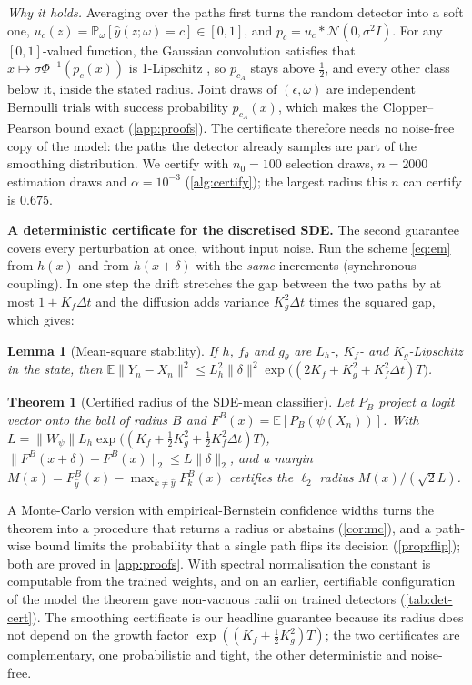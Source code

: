 \documentclass{article}
\newtheorem{theorem}{Theorem}
\newtheorem{lemma}{Lemma}
\theoremstyle{definition}
\newcommand{\Exp}{\mathbb{E}}
\newcommand{\Prob}{\mathbb{P}}
\begin{document}
\emph{Why it holds.} Averaging over the paths first turns the random detector
into a soft one, $u_c(z)=\Prob_\omega[\hat y(z;\omega)=c]\in[0,1]$, and
$p_c=u_c*\mathcal N(0,\sigma^2I)$. For any $[0,1]$-valued function, the
Gaussian convolution satisfies that $x\mapsto\sigma\Phi^{-1}(p_c(x))$ is
1-Lipschitz \citep[Lemma~2]{salman2019smoothadv}, so $p_{c_A}$ stays above
$\tfrac12$, and every other class below it, inside the stated radius. Joint
draws of $(\epsilon,\omega)$ are independent Bernoulli trials with success
probability $p_{c_A}(x)$, which makes the Clopper--Pearson bound exact
(\cref{app:proofs}). The certificate therefore needs no noise-free copy of the
model: the paths the detector already samples are part of the smoothing
distribution. We certify with $n_0=100$ selection draws, $n=2000$ estimation
draws and $\alpha=10^{-3}$ (\cref{alg:certify}); the largest radius this $n$ can
certify is $0.675$.




\textbf{A deterministic certificate for the discretised SDE.} The second
guarantee covers every perturbation at once, without input noise. Run the scheme
\eqref{eq:em} from $h(x)$ and from $h(x+\delta)$ with the \emph{same} increments
(synchronous coupling). In one step the drift stretches the gap between the two
paths by at most $1+K_f\Delta t$ and the diffusion adds variance $K_g^2\Delta t$
times the squared gap, which gives:

\begin{lemma}[Mean-square stability]\label{lem:ms}
If $h$, $f_\theta$ and $g_\theta$ are $L_h$-, $K_f$- and $K_g$-Lipschitz in the
state, then $\Exp\|Y_n-X_n\|^2\le L_h^2\|\delta\|^2\exp\bigl((2K_f+K_g^2+K_f^2\Delta t)T\bigr)$.
\end{lemma}

\begin{theorem}[Certified radius of the SDE-mean classifier]\label{thm:mean-cert}
Let $P_B$ project a logit vector onto the ball of radius $B$ and
$F^B(x)=\Exp[P_B(\psi(X_n))]$. With
$L=\|W_\psi\|L_h\exp\bigl((K_f+\tfrac12K_g^2+\tfrac12K_f^2\Delta t)T\bigr)$,
$\|F^B(x+\delta)-F^B(x)\|_2\le L\|\delta\|_2$, and a margin
$M(x)=F^B_{\hat y}(x)-\max_{k\ne\hat y}F^B_k(x)$ certifies the $\ell_2$ radius
$M(x)/(\sqrt2L)$.
\end{theorem}

A Monte-Carlo version with empirical-Bernstein confidence widths turns the
theorem into a procedure that returns a radius or abstains (\cref{cor:mc}), and
a path-wise bound limits the probability that a single path flips its decision
(\cref{prop:flip}); both are proved in \cref{app:proofs}. With spectral
normalisation the constant is computable from the trained weights, and on an
earlier, certifiable configuration of the model the theorem gave non-vacuous
radii on trained detectors (\cref{tab:det-cert}). The smoothing certificate is
our headline guarantee because its radius does not depend on the growth factor
$\exp((K_f+\frac12K_g^2)T)$; the two certificates are complementary, one
probabilistic and tight, the other deterministic and noise-free.
\end{document}
